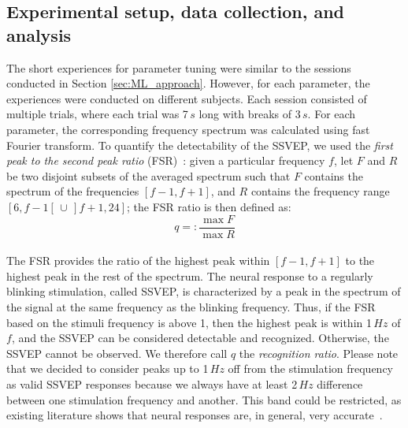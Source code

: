 \documentclass[smallextended]{svjour3}
\begin{document}
\subsection{Experimental setup, data collection, and analysis}
The short experiences for parameter tuning were similar to the sessions conducted in Section \ref{sec:ML_approach}. 
However, for each parameter, the experiences were conducted on different subjects. Each session consisted of multiple trials, where each trial was 7\,$s$ long with breaks of 3\,$s$. 
For each parameter, the corresponding frequency spectrum was calculated using fast Fourier transform. 
To quantify the detectability of the SSVEP, we used the \textit{first peak to the second peak ratio} (FSR)~\cite{Zheng2010}:
given a particular frequency $f$, let $F$ and $R$ be two disjoint subsets of the averaged spectrum such that $F$ contains the spectrum of the frequencies $[f-1, f+1]$, and $R$ contains the frequency range $[6, f-1[ \,\cup\, ]f+1, 24]$; the FSR ratio is then defined as:
\begin{equation}
\label{recog_rat}
q =:\frac{\max F}{\max R}
\end{equation}
\\
The FSR provides the ratio of the highest peak within $[f-1, f+1]$ to the highest peak in the rest of the spectrum. 
The neural response to a regularly blinking stimulation, called SSVEP, is characterized by a peak in the spectrum of the signal at the same frequency as the blinking frequency. 
Thus, if the FSR based on the stimuli frequency is above 1, then the highest peak is within 1\,$Hz$ of $f$, and the SSVEP can be considered detectable and recognized. 
Otherwise, the SSVEP cannot be observed. 
We therefore call $q$ the \textit{recognition ratio}.
Please note that we decided to consider peaks up to 1\,$Hz$ off from the stimulation frequency as valid SSVEP responses because we always have at least 2\,$Hz$ difference between one stimulation frequency and another. 
This band could be restricted, as existing literature shows that neural responses are, in general, very accurate~\cite{SSVEPfiability}.
\end{document}
